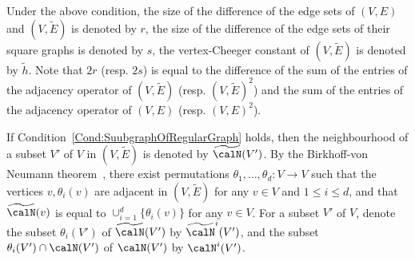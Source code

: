 Under the above condition, the size of the difference of the edge sets of $(V, E)$ and $(V, \widetilde E)$ is denoted by $r$, the size of the difference of the edge sets of their square graphs is denoted by $s$, the vertex-Cheeger constant of $(V, \widetilde E)$ is denoted by $\widetilde h$. Note that $2r$ (resp. $2s$) is equal to the difference of the sum of the entries of the adjacency operator of $(V, \widetilde E)$ (resp. $(V, \widetilde E)^2$) and the sum of the entries of the adjacency operator of $(V, E)$ (resp. $(V, E)^2$). 

\begin{remark}
\label{Rk:NotationsCalN}
If Condition~\ref{Cond:SuubgraphOfRegularGraph} holds, then the neighbourhood of a subset $V'$ of $V$ in $(V, \widetilde E)$ is denoted by $\widetilde \calN(V')$. By the Birkhoff-von Neumann theorem~\cite[Theorem~5.5]{vanLintWilsonCourseCombi}, there exist permutations $\theta_1, \ldots, \theta_d: V\to V$ such that the vertices $v, \theta_i(v)$ are adjacent in $(V, \widetilde E)$ for any $v\in V$ and $1\leq i \leq d$, and that $\widetilde \calN(v)$ is equal to $\cup_{i=1}^d \{\theta_i(v)\}$ for any $v\in V$. For a subset $V'$ of $V$, denote the subset $\theta_i(V')$ of $\widetilde \calN(V')$ by $\widetilde \calN^i(V')$, and the subset $\theta_i(V') \cap \calN (V')$ of $\calN(V')$ by $\calN^i(V')$.
\end{remark}

